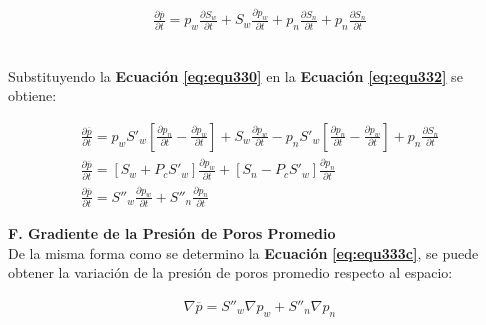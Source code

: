 \begin{ceqn} 
\begin{gather} \label{eq:equ332} 
\frac{\partial \overline{p}}{\partial t} = p_w\frac{\partial S_w}{\partial t} + S_w\frac{\partial p_w}{\partial t} + p_n\frac{\partial S_n}{\partial t} + p_n\frac{\partial S_n}{\partial t}
\end{gather}  
\end{ceqn}
\\
Substituyendo la \textbf{Ecuación} \textbf{\ref{eq:equ330}} en la \textbf{Ecuación} \textbf{\ref{eq:equ332}} se obtiene:

\begin{ceqn} 
\begin{subequations} \label{eq:equ333} 
\begin{gather}
\frac{\partial \overline{p}}{\partial t} = p_w S'_w\left[\frac{\partial p_n}{\partial t}-\frac{\partial p_w}{\partial t}\right] + S_w\frac{\partial p_w}{\partial t} - p_n S'_w\left[\frac{\partial p_n}{\partial t}-\frac{\partial p_w}{\partial t}\right] + p_n\frac{\partial S_n}{\partial t} \label{eq:equ333a} \\[12pt]
\frac{\partial \overline{p}}{\partial t} = \left[S_w + P_c S'_w\right]\frac{\partial p_w}{\partial t} + \left[S_n - P_c S'_w\right]\frac{\partial p_n}{\partial t}  \label{eq:equ333b} \\[12pt]
\frac{\partial \overline{p}}{\partial t} = S''_w\frac{\partial p_w}{\partial t} + S''_n\frac{\partial p_n}{\partial t}  \label{eq:equ333c}
\end{gather}  
\end{subequations} 
\end{ceqn}

\textbf{F. Gradiente de la Presión de Poros Promedio}
\\
De la misma forma como se determino la \textbf{Ecuación} \textbf{\ref{eq:equ333c}}, se puede obtener la variación de la presión de poros promedio respecto al espacio:

\begin{ceqn} 
\begin{gather} \label{eq:equ334} 
\nabla \overline{p} = S''_w\nabla p_w + S''_n\nabla p_n
\end{gather}  
\end{ceqn}
\bigskip

